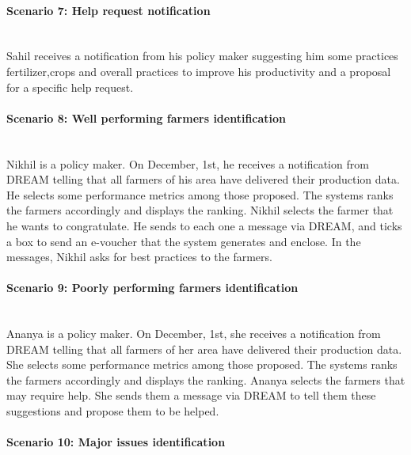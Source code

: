 \paragraph{Scenario 7: Help request notification}\mbox{} \\

Sahil receives a notification from his policy maker suggesting him some practices fertilizer,crops and overall practices to improve his productivity and a proposal for a specific help request.

\paragraph{Scenario 8: Well performing farmers identification}\mbox{} \\

Nikhil is a policy maker. On December, 1st, he receives a notification from DREAM telling that all farmers of his area have delivered their production data. He selects some performance metrics among those proposed. The systems ranks the farmers accordingly and displays the ranking. Nikhil selects the farmer that he wants to congratulate. He sends to each one a message via DREAM, and ticks a box to send an e-voucher that the system generates and enclose. In the messages, Nikhil asks for best practices to the farmers.

\paragraph{Scenario 9: Poorly performing farmers identification}\mbox{} \\
Ananya is a policy maker. On December, 1st, she receives a notification from DREAM telling that all farmers of her area have delivered their production data. She selects some performance metrics among those proposed. The systems ranks the farmers accordingly and displays the ranking. Ananya selects the farmers that may require help. She sends them a message via DREAM to tell them these suggestions and propose them to be helped.

\paragraph{Scenario 10: Major issues identification}\mbox{} \\

